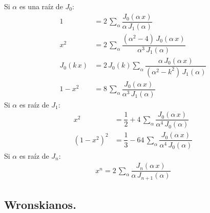 Si $\alpha$ es una raíz de $J_{0}$:
\begin{align*}
1 &= 2 \, \sum_{\alpha} \dfrac{J_{0} (\alpha \, x)}{\alpha \, J_{1} (\alpha)} \\[0.5em]
x^{2} &= 2 \, \sum_{\alpha} \dfrac{(\alpha^{2}- 4) \, J_{0} (\alpha \, x)}{\alpha^{3} \, J_{1} (\alpha)} \\[0.5em]
J_{0} (k \, x) &= 2 \, J_{0} (k) \sum_{\alpha} \dfrac{\alpha \, J_{0} (\alpha \, x)}{(\alpha^{2} - k^{2}) \, J_{1}(\alpha)} \\[0.5em]
1 -x^{2} &= 8 \, \sum_{\alpha} \dfrac{J_{0}(\alpha \, x)}{\alpha^{3} \, J_{1} (\alpha)}
\end{align*}
Si $\alpha$ es raíz de $J_{1}$:
\begin{align*}
x^{2} &= \dfrac{1}{2} + 4 \, \sum_{\alpha} \dfrac{J_{0} (\alpha \, x)}{\alpha^{4} \, J_{0} (\alpha)} \\[0.5em]
(1 - x^{2})^{2} &= \dfrac{1}{3} - 64 \, \sum_{\alpha} \dfrac{J_{0} (\alpha \, x)}{\alpha^{4} \, J_{0} (\alpha)}
\end{align*}
Si $\alpha$ es raíz de $J_{n}$:
\begin{align*}
x^{n} = 2 \, \sum_{\alpha} \dfrac{J_{n} (\alpha \, x)}{\alpha \, J_{n+1} (\alpha)}
\end{align*}

\subsection{Wronskianos.}

